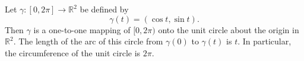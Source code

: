 Let $\gamma: [0, 2\pi] \to \mathbb{R}^2$ be defined by
$$
\gamma(t) = (\cos t, \sin t).
$$
Then $\gamma$ is a one-to-one mapping of $[0, 2\pi)$ onto the unit circle about the origin in $\mathbb{R}^2$. The length of the arc of this circle from $\gamma(0)$ to $\gamma(t)$ is $t$. In particular, the circumference of the unit circle is $2\pi$.
